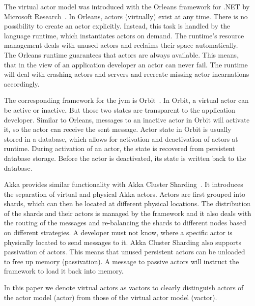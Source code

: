   The virtual actor model was introduced with the Orleans framework for .NET by Microsoft Research~\cite{bernstein:orleans}.
  In Orleans, actors (virtually) exist at any time.
  There is no possibility to create an actor explicitly.
  Instead, this task is handled by the language runtime, which instantiates actors on demand.
  The runtime's resource management deals with unused actors and reclaims their space automatically.
  The Orleans runtime guarantees that actors are always available.
  This means, that in the view of an application developer an actor can never fail.
  The runtime will deal with crashing actors and servers and recreate missing actor incarnations accordingly.

  The corresponding framework for the \gls{jvm} is Orbit~\cite{orbit}.
  In Orbit, a virtual actor can be active or inactive.
  But those two states are transparent to the application developer.
  Similar to Orleans, messages to an inactive actor in Orbit will activate it, so the actor can receive the sent message.
  Actor state in Orbit is usually stored in a database, which allows for activation and deactivation of actors at runtime.
  During activation of an actor, the state is recovered from persistent database storage.
  Before the actor is deactivated, its state is written back to the database.

  Akka provides similar functionality with Akka Cluster Sharding~\cite{akka:clustersharding}.
  It introduces the separation of virtual and physical Akka actors.
  Actors are first grouped into shards, which can then be located at different physical locations.
  The distribution of the shards and their actors is managed by the framework and it also deals with the routing of the messages and re-balancing the shards to different nodes based on different strategies.
  A developer must not know, where a specific actor is physically located to send messages to it.
  Akka Cluster Sharding also supports passivation of actors.
  This means that unused persistent actors can be unloaded to free up memory (passivation).
  A message to passive actors will instruct the framework to load it back into memory.

  In this paper we denote virtual actors as vactors to clearly distinguish actors of the actor model (actor) from those of the virtual actor model (vactor).

